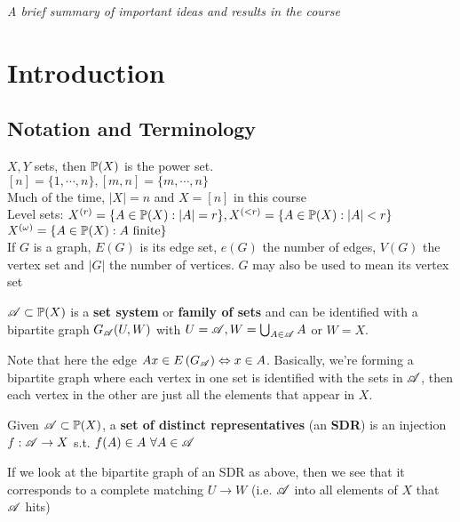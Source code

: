 \documentclass[a4paper]{article}
\begin{document}
\maketitle
{\small \centering
\noindent\emph{A brief summary of important ideas and results in the course}

\section{Introduction}
\subsection{Notation and Terminology}
\begin{notation}
$X,Y$ sets, then $\P(X)$ is the power set.\\
$[n]=\{1,\cdots,n\}, [m,n]=\{m,\cdots, n\}$\\
Much of the time, $|X|=n$ and $X=[n]$ in this course\\
Level sets: $X^{(r)}=\{A\in\P(X) : |A|=r\}, X^{(<r)}=\{A\in\P(X) : |A|<r\}$\\
$X^{(\omega)}=\{A\in\P(X) : A\ \mathrm{finite}\}$\\
If $G$ is a graph, $E(G)$ is its edge set, $e(G)$ the number of edges, $V(G)$ the vertex set and $|G|$ the number of vertices.  $G$ may also be used to mean its vertex set
\end{notation}


\begin{defi}
	$\A\subset \P(X)$ is a \textbf{set system} or \textbf{family of sets} and can be identified with a bipartite graph $G_{\A}(U,W)$ with $U=\A, W=\bigcup_{A\in\A}A$ or $W=X$.
\end{defi}

Note that here the edge $Ax\in E\left(G_{\A}\right)\Leftrightarrow x\in A$. Basically, we're forming a bipartite graph where each vertex in one set is identified with the sets in $\A$, then each vertex in the other are just all the elements that appear in $X$.

\begin{defi}
	Given $\A \subset \P(X)$, a \textbf{set of distinct representatives} (an \textbf{SDR}) is an injection $f:\A\rightarrow X$ s.t. $f(A)\in A\ \forall A\in\A$
\end{defi}

If we look at the bipartite graph of an SDR as above, then we see that it corresponds to a complete matching $U\rightarrow W$ (i.e. $\A$ into all elements of $X$ that $\A$ hits)

}
\end{document}
